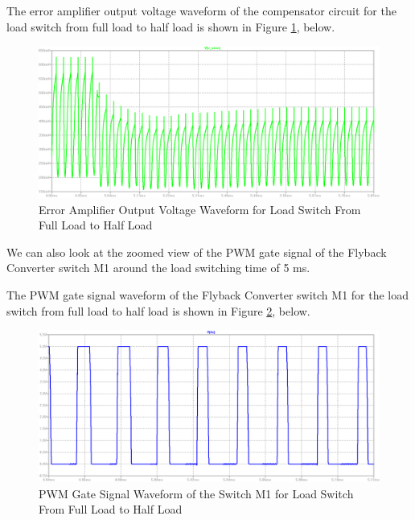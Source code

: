 The error amplifier output voltage waveform of the compensator circuit for the load switch from full load to half load is shown in Figure \ref{com:Verror_FH}, below.

\begin{figure}[H]
\begin{center}
\includegraphics[width=1\textwidth]{comp_simulations/Verror_FH.png}
\caption{Error Amplifier Output Voltage Waveform for Load Switch From Full Load to Half Load}
\label{com:Verror_FH}
\end{center}
\end{figure}

We can also look at the zoomed view of the PWM gate signal of the Flyback Converter switch M1 around the load switching time of 5 ms.

The PWM gate signal waveform of the Flyback Converter switch M1 for the load switch from full load to half load is shown in Figure \ref{com:dutycycle_FH}, below.

\begin{figure}[H]
\begin{center}
\includegraphics[width=1\textwidth]{comp_simulations/dutycycle_FH.png}
\caption{PWM Gate Signal Waveform of the Switch M1 for Load Switch From Full Load to Half Load}
\label{com:dutycycle_FH}
\end{center}
\end{figure}

